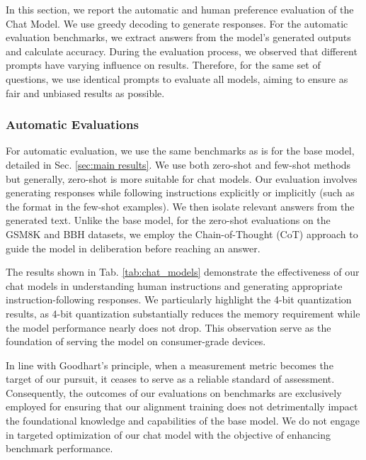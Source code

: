 
In this section, we report the automatic and human preference evaluation of the Chat Model. 
We use greedy decoding to generate responses. For the automatic evaluation benchmarks, we extract answers from the model's generated outputs and calculate accuracy. During the evaluation process, we observed that different prompts have varying influence on  results. Therefore, for the same set of questions, we use identical prompts to evaluate all models, aiming to ensure as fair and unbiased results as possible.

% 


\subsubsection{Automatic Evaluations}


For automatic evaluation, we use the same benchmarks as is for the base model, detailed in Sec. \ref{sec:main results}.
We use both zero-shot and few-shot methods but generally, zero-shot is more suitable for chat models. Our evaluation involves generating responses while following instructions explicitly or implicitly (such as the format in the few-shot examples). We then isolate relevant answers from the generated text. Unlike the base model, for the zero-shot evaluations on the GSM8K and BBH datasets, we employ the Chain-of-Thought (CoT) approach to guide the model in deliberation before reaching an answer.


The results shown in Tab. \ref{tab:chat_models} demonstrate the effectiveness of our chat models in understanding human instructions and generating appropriate instruction-following responses. 
We particularly highlight the 4-bit quantization results, as 4-bit quantization substantially reduces the memory requirement while the model performance nearly does not drop. 
This observation serve as the foundation of serving the model on consumer-grade devices. 



In line with Goodhart's principle, when a measurement metric becomes the target of our pursuit, it ceases to serve as a reliable standard of assessment. Consequently, the outcomes of our evaluations on benchmarks are exclusively employed for ensuring that our alignment training does not detrimentally impact the foundational knowledge and capabilities of the base model. We do not engage in targeted optimization of our chat model with the objective of enhancing benchmark performance.


